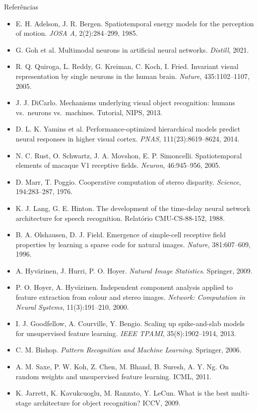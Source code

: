 \documentclass[aspectratio=169,11pt]{beamer}
\begin{document}
\begin{frame}[allowframebreaks]{Referências}
\begin{itemize}
    \item E. H. Adelson, J. R. Bergen. Spatiotemporal energy models for the perception of motion. \emph{JOSA A}, 2(2):284--299, 1985.
    \item G. Goh et al. Multimodal neurons in artificial neural networks. \emph{Distill}, 2021.
    \item R. Q. Quiroga, L. Reddy, G. Kreiman, C. Koch, I. Fried. Invariant visual representation by single neurons in the human brain. \emph{Nature}, 435:1102--1107, 2005.
    \item J. J. DiCarlo. Mechanisms underlying visual object recognition: humans vs.\ neurons vs.\ machines. Tutorial, NIPS, 2013.
    \item D. L. K. Yamins et al. Performance-optimized hierarchical models predict neural responses in higher visual cortex. \emph{PNAS}, 111(23):8619--8624, 2014.
    \item N. C. Rust, O. Schwartz, J. A. Movshon, E. P. Simoncelli. Spatiotemporal elements of macaque V1 receptive fields. \emph{Neuron}, 46:945--956, 2005.
    \item D. Marr, T. Poggio. Cooperative computation of stereo disparity. \emph{Science}, 194:283--287, 1976.
    \item K. J. Lang, G. E. Hinton. The development of the time-delay neural network architecture for speech recognition. Relatório CMU-CS-88-152, 1988.
    \item B. A. Olshausen, D. J. Field. Emergence of simple-cell receptive field properties by learning a sparse code for natural images. \emph{Nature}, 381:607--609, 1996.
    \item A. Hyvärinen, J. Hurri, P. O. Hoyer. \emph{Natural Image Statistics}. Springer, 2009.
    \item P. O. Hoyer, A. Hyvärinen. Independent component analysis applied to feature extraction from colour and stereo images. \emph{Network: Computation in Neural Systems}, 11(3):191--210, 2000.
    \item I. J. Goodfellow, A. Courville, Y. Bengio. Scaling up spike-and-slab models for unsupervised feature learning. \emph{IEEE TPAMI}, 35(8):1902--1914, 2013.
    \item C. M. Bishop. \emph{Pattern Recognition and Machine Learning}. Springer, 2006.
    \item A. M. Saxe, P. W. Koh, Z. Chen, M. Bhand, B. Suresh, A. Y. Ng. On random weights and unsupervised feature learning. ICML, 2011.
    \item K. Jarrett, K. Kavukcuoglu, M. Ranzato, Y. LeCun. What is the best multi-stage architecture for object recognition? ICCV, 2009.

\end{itemize}
\end{frame}
\end{document}
